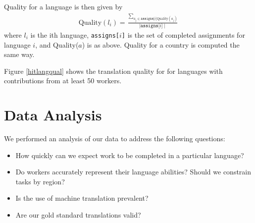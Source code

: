 \documentclass[11pt]{article}
\begin{document}
%

Quality for a language is then given by
\begin{align}	
	\text{Quality}(l_i) = \frac{\sum_{a_j \in \texttt{assigns[$i$]}\text{Quality}(a_j)}}{\mid \texttt{assigns[$i$]} \mid}
\end{align}	
where $l_i$ is the ith language, \texttt{assigns[$i$]} is the set of completed assignments for language $i$, and Quality($a$) is as above. Quality for a country is computed the same way.



Figure \ref{hitlangqual} shows the translation quality for for languages with contributions from at least 50 workers.  



\section{Data Analysis}

We performed an analysis of our data to address the following questions:
\begin{itemize}
\item How quickly can we expect work to be completed in a particular language? 
\item Do workers accurately represent their language abilities?  Should we constrain tasks by region? 
\item Is the use of machine translation prevalent?  
\item Are our gold standard translations valid? 
\end{itemize}
\end{document}
